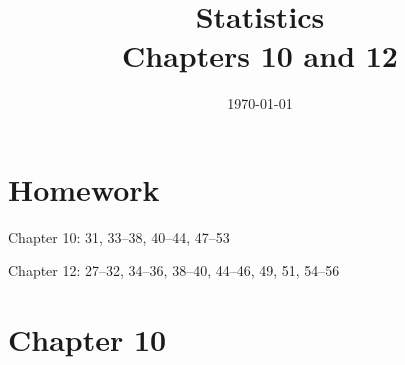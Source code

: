 \documentclass[letterpaper, landscape]{exam}
\title{Statistics \\ Chapters 10 and 12}
\date{\today}
\author{}
\begin{document}
  \maketitle

  \ifprintanswers{}
  \else
    \section{Homework}
    \begin{itemize*}
      \item Chapter 10: 31, 33--38, 40--44, 47--53
      \item Chapter 12: 27--32, 34--36, 38--40, 44--46, 49, 51, 54--56
    \end{itemize*}
  \fi

  \ifprintanswers{}
  \section{Chapter 10} %
  
\end{document}

